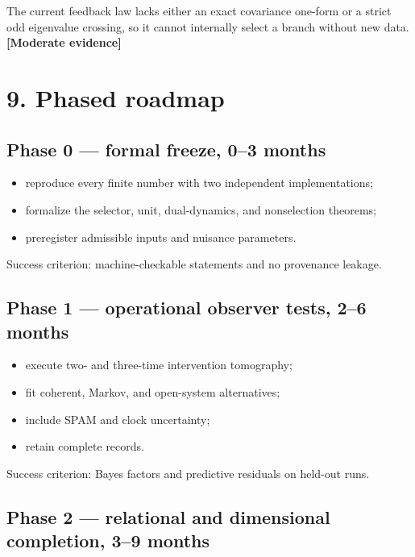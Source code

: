 \documentclass[11pt,a4paper,openany]{report}
\newcommand{\statusModerate}{\textcolor{finviolet}{[Moderate evidence]}}
\begin{document}
The current feedback law lacks either an exact covariance one-form or a strict odd eigenvalue crossing, so it cannot internally select a branch without new data. \textbf{\statusModerate{}}

\section{9. Phased roadmap}

\subsection{Phase 0 — formal freeze, 0–3 months}

\begin{itemize}
\item 
reproduce every finite number with two independent implementations;

\item 
formalize the selector, unit, dual-dynamics, and nonselection theorems;

\item 
preregister admissible inputs and nuisance parameters.

\end{itemize}

Success criterion: machine-checkable statements and no provenance leakage.

\subsection{Phase 1 — operational observer tests, 2–6 months}

\begin{itemize}
\item 
execute two- and three-time intervention tomography;

\item 
fit coherent, Markov, and open-system alternatives;

\item 
include SPAM and clock uncertainty;

\item 
retain complete records.

\end{itemize}

Success criterion: Bayes factors and predictive residuals on held-out runs.

\subsection{Phase 2 — relational and dimensional completion, 3–9 months}
\end{document}
